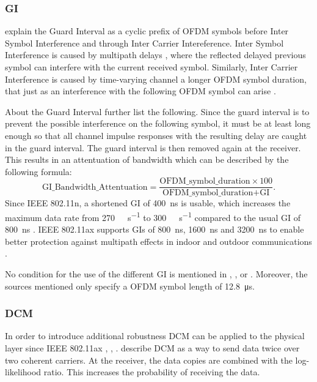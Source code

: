 
\subsubsection*{\acf{GI}}
\textcite{pulimamidi_development_2007} explain the Guard Interval as a cyclic prefix of OFDM symbols before Inter Symbol Interference and through Inter Carrier Intereference. Inter Symbol Interference is caused by multipath delays , where the reflected delayed previous symbol can interfere with the current received symbol\cite{ravindranath_performance_2016}. Similarly, Inter Carrier Interference is caused by time-varying channel a longer OFDM symbol duration, that just as an interference with the following OFDM symbol can arise \cite{van_duc_nguyen_intercarrier_2002}.

About the Guard Interval \textcite{pulimamidi_development_2007} further list the following. 
Since the guard interval is to prevent the possible interference on the following symbol, it must be at least long enough so that all channel impulse responses with the resulting delay are caught in the guard interval. 
The guard interval is then removed again at the receiver. This results in an attentuation of bandwidth which can be described
by the following formula:
\begin{equation}\label{eq:GI}
	\text{GI\_Bandwidth\_Attentuation} =
	\frac{
		\text{OFDM\_symbol\_duration} \times 100
	}{
		\text{OFDM\_symbol\_duration} + \text{GI}
	}
	.
\end{equation}
Since IEEE 802.11n, a shortened \ac{GI} of \SI{400}{\nano\second} is usable, which increases the maximum data rate from \SI{270}{\mega\bit\per\second} to \SI{300}{\mega\bit\per\second} compared to the usual \ac{GI} of \SI{800}{\nano\second} \cite{sauter_wireless_2022}.
IEEE 802.11ax supports \ac{GI}s of \SI{800}{\nano\second}, \SI{1600}{\nano\second} and \SI{3200}{\nano\second} to
enable better protection against  multipath effects in indoor and outdoor communications \cite{deng_ieee_2017}.

No condition for the use of the different \ac{GI} is mentioned in \cite{deng_ieee_2017}, \cite{mozaffariahrar_survey_2022}, \cite{Rochim} or \cite{afaqui_ieee_2017}. Moreover, the sources mentioned only specify a \ac{OFDM} symbol length of \SI{12.8}{\micro\second}.

\subsubsection*{\acf{DCM}}
In order to introduce additional robustness \ac{DCM} can be applied to the physical layer since IEEE 802.11ax \cite{jacob_system-level_2020}, \cite{triwinarko_phy_2021}, \cite{noauthor_ieee_2021}. \textcite{jacob_system-level_2020} describe \ac{DCM} as a way to send data twice over two coherent carriers. At the receiver, the data copies are combined with the log-likelihood ratio. This increases the probability of receiving the data.

